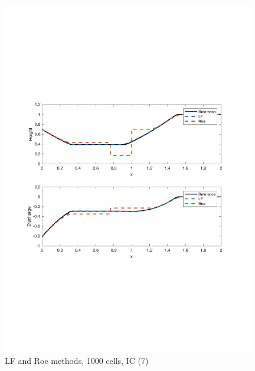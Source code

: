 \documentclass[11pt,a4paper]{article}
\begin{document}
\begin{figure}[!htb]
    \centering
    \includegraphics[width=11cm]{pictures/IC_4_1000_cells.pdf}
    \caption{LF and Roe methods, 1000 cells, IC (7)}
    \label{fig:IC_4_1000_cells}
\end{figure}
\end{document}

